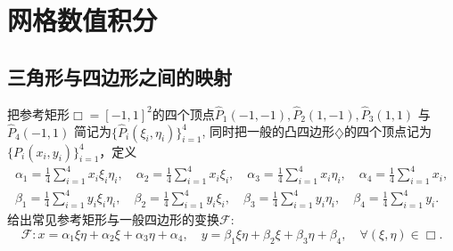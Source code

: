 \documentclass[10pt,reqno, final]{ctexartutf8}
\begin{document}
\graphicspath{{./figs/}}
\tableofcontents
\newpage
\section{网格数值积分}
\subsection{三角形与四边形之间的映射}\label{chapter3.1}
把参考矩形$\Box=[-1,1]^2$的四个顶点$\widehat{P}_1(-1,-1),\widehat{P}_2(1,-1),\widehat{P}_3(1,1)$ 与 $\widehat{P}_4(-1,1)$ 简记为$\{\widehat P_i(\xi_i, \eta_i)\}_{i=1}^4$, 同时把一般的凸四边形$\diamondsuit$的四个顶点记为
$\{P_i(x_i, y_i)\}_{i=1}^4$，定义
\begin{equation}\label{paratransform1}
\begin{split}
\alpha_1=\frac{1}{4}\sum\limits_{i=1}^4x_i\xi_i\eta_i, \quad\alpha_2=\frac{1}{4}\sum\limits_{i=1}^4x_i\xi_i,\quad \alpha_3=\frac{1}{4}\sum\limits_{i=1}^4x_i\eta_i,\quad
 \alpha_4=\frac{1}{4}\sum\limits_{i=1}^4x_i,\\
 \beta_1=\frac{1}{4}\sum\limits_{i=1}^4y_i\xi_i\eta_i, \quad\beta_2=\frac{1}{4}\sum\limits_{i=1}^4y_i\xi_i,\quad \beta_3=\frac{1}{4}\sum\limits_{i=1}^4y_i\eta_i,\quad\beta_4=\frac{1}{4}\sum\limits_{i=1}^4y_i.
\end{split}
\end{equation}
给出常见参考矩形与一般四边形的变换$\mathscr F$:
\begin{equation}\label{transform1}
\mathscr F:   x = \alpha_1\xi\eta+\alpha_2\xi+\alpha_3\eta+\alpha_4,\quad y =\beta_1\xi\eta+\beta_2\xi+\beta_3\eta+\beta_4,\quad \forall (\xi, \eta) \in \Box.
\end{equation}
\end{document}
